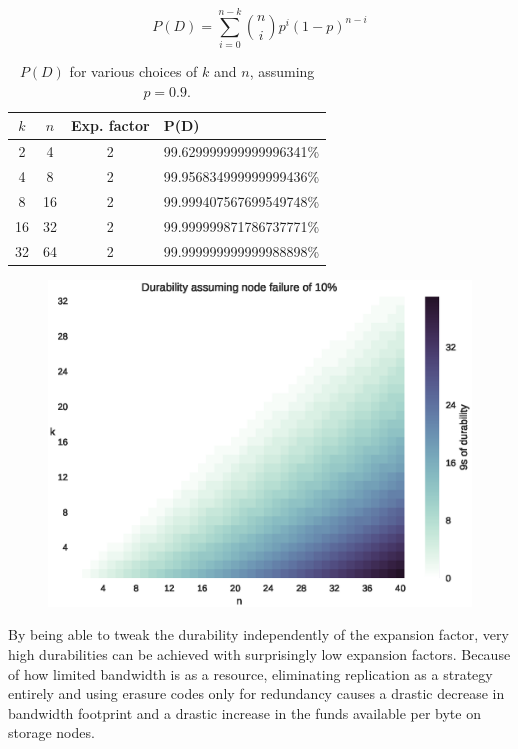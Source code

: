 \documentclass[a4paper,10pt]{article} \usepackage[utf8]{inputenc}
\begin{document}
\begin{equation} P(D) = \sum_{i=0}^{n-k} \binom{n}{i} p^i
(1-p)^{n-i}\label{eq:binom_cdf}
\end{equation}

\begin{table}[b]
\centering
\begin{tabular}{c c c l}
$k$ & $n$ & Exp. factor & P(D) \\
\hline 2 & 4 & 2 & 99.629999999999996341\%\\
4 & 8 & 2 & 99.956834999999999436\%\\
8 & 16 & 2 & 99.999407567699549748\%\\
16 & 32 & 2 & 99.999999871786737771\%\\
32 & 64 & 2 & 99.999999999999988898\%\\
\end{tabular}
\caption{$P(D)$ for various choices of $k$ and $n$, assuming $p=0.9$.}
\end{table}

\begin{figure} \centering
\includegraphics[width=\linewidth]{durability/durability.eps}
\end{figure}


By being able to tweak the durability independently of the expansion factor,
very high durabilities can be achieved with surprisingly low expansion factors.
Because of how limited bandwidth is as a resource, eliminating replication as a
strategy entirely and using erasure codes only for redundancy causes a drastic
decrease in bandwidth footprint and a drastic increase in the funds available
per byte on storage nodes.
\end{document}
